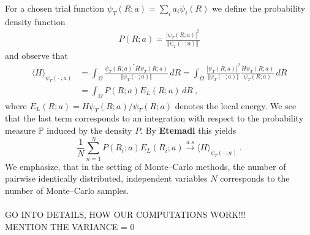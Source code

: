 \documentclass[11pt,a4paper]{article}
\numberwithin{equation}{section}
\begin{document}
For a chosen trial function $\psi_T(R;a)=\sum_{i}a_i\psi_i(R)$ we define the probability density function 
\begin{align*}
P(R;a) = \frac{|\psi_T(R;a)|^2}{\Vert \psi_T(\cdot\;;a)\Vert}
\end{align*} 
and observe that 
\begin{align*}
\langle H \rangle_{\psi_T(\cdot\;;a)} 
&= \int_{\Omega}\frac{\psi_T(R;a)^*H\psi_T(R;a)}{\Vert \psi_T(\cdot\;;a)\Vert}\,dR
=\int_{\Omega} \frac{|\psi_T(R;a)|^2}{\Vert \psi_T(\cdot\;;a)\Vert}\frac{H\psi_T(R;a)}{\psi_T(R;a)}\,dR\\
&=\int_{\Omega} P(R;a)E_L(R;a)\,dR~,
\end{align*}
where $E_L(R;a) = H\psi_T(R;a)/\psi_T(R;a)$ denotes the local energy. 
%
We see that the last term corresponds to an integration with respect to the probability measure $\mathbb{P}$ induced by the density $P$.
%
By \textbf{Etemadi} this yields
\begin{equation}
\label{eq:StrongLawofBN}
\frac{1}{N}\sum_{n=1}^NP(R_i;a)E_L(R_i;a)\overset{a.s}{\longrightarrow}\langle H \rangle_{\psi_T(\cdot\;;a)}~.
\end{equation}
We emphasize, that in the setting of Monte--Carlo methods, the number of pairwise identically distributed, independent variables $N$ corresponds to the number of  Monte--Carlo samples.\\
\\
GO INTO DETAILS, HOW OUR COMPUTATIONS WORK!!!\\
MENTION THE VARIANCE = 0\\
\\
\end{document}
